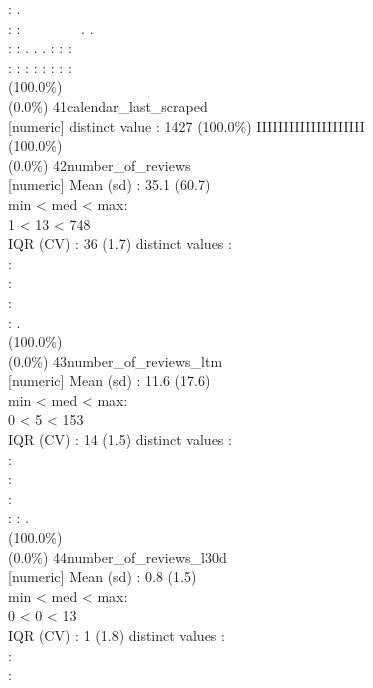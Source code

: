 \documentclass[
  journal,
]{IEEEtran}%
\begin{document}
: .\\
: : ~~~~~~~~. .\\
: : . . . : : :\\
: : : : : : : : \\
(100.0\%) \\
(0.0\%) \textbar{} \textbar{} 41\textbar calendar\_last\_scraped\\
{[}numeric{]}  distinct value  : 1427 (100.0\%)
\textbar{} \textbar IIIIIIIIIIIIIIIIIIII \\
(100.0\%) \\
(0.0\%) \textbar{} \textbar{} 42\textbar number\_of\_reviews\\
{[}numeric{]} \textbar Mean (sd) : 35.1 (60.7)\\
min \textless{} med \textless{} max:\\
1 \textless{} 13 \textless{} 748\\
IQR (CV) : 36 (1.7)  distinct values \textbar{} \textbar:\\
:\\
:\\
:\\
: . \\
(100.0\%) \\
(0.0\%) \textbar{} \textbar{} 43\textbar number\_of\_reviews\_ltm\\
{[}numeric{]} \textbar Mean (sd) : 11.6 (17.6)\\
min \textless{} med \textless{} max:\\
0 \textless{} 5 \textless{} 153\\
IQR (CV) : 14 (1.5)  distinct values \textbar{} \textbar:\\
:\\
:\\
:\\
: : . \\
(100.0\%) \\
(0.0\%) \textbar{} \textbar{} 44\textbar number\_of\_reviews\_l30d\\
{[}numeric{]} \textbar Mean (sd) : 0.8 (1.5)\\
min \textless{} med \textless{} max:\\
0 \textless{} 0 \textless{} 13\\
IQR (CV) : 1 (1.8)  distinct values \textbar{} \textbar:\\
:\\
:\\
\end{document}
